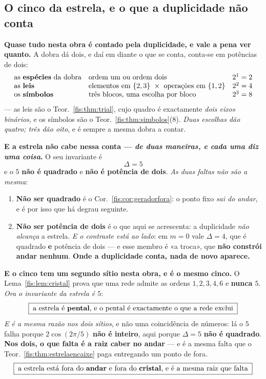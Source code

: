 \documentclass[livro.tex]{subfiles}
\begin{document}
\subsection*{O cinco da estrela, e o que a duplicidade não conta}

\noindent\textbf{Quase tudo nesta obra é contado pela duplicidade, e vale a pena
ver quanto.} A dobra dá dois, e daí em diante o que se conta, conta-se em potências
de dois:
\[
\begin{array}{lll}
\text{as \textbf{espécies} da dobra} & \text{ordem um ou ordem dois} & 2^{1}=2\\
\text{as \textbf{leis}} & \text{elementos em }\{2,3\}\ \times\ \text{operações em }\{1,2\} & 2^{2}=4\\
\text{os \textbf{símbolos}} & \text{três blocos, uma escolha por bloco} & 2^{3}=8
\end{array}
\]
--- as leis são o Teor.~\ref{fis:thm:trial}, cujo quadro é exactamente
\emph{dois eixos binários}, e os símbolos são o Teor.~\ref{fis:thm:simbolos}(8).
\emph{Duas escolhas dão quatro; três dão oito}, e é sempre a mesma dobra a contar.

\medskip\noindent\textbf{E a estrela não cabe nessa conta --- \emph{de duas
maneiras, e cada uma diz uma coisa}.} O seu invariante é
\[
\boxed{\;\Delta=5\;}
\]
e o $5$ \textbf{não é quadrado} e \textbf{não é potência de dois}. \emph{As duas
faltas não são a mesma}:
\begin{enumerate}\itemsep3pt
\item[(1)] \textbf{Não ser quadrado} é o Cor.~\ref{fis:cor:geradorfora}: o ponto
fixo \emph{sai do andar}, e é por isso que há degrau seguinte.
\item[(2)] \textbf{Não ser potência de dois} é o que aqui se acrescenta: a
duplicidade \emph{não alcança} a estrela. \emph{E o contraste está ao lado}: em
$m=0$ vale $\Delta=4$, que é quadrado \textbf{e} potência de dois --- e esse
membro é «a troca», que \textbf{não constrói andar nenhum}. \textbf{Onde a
duplicidade conta, nada de novo aparece.}
\end{enumerate}

\medskip\noindent\textbf{E o cinco tem um segundo sítio nesta obra, e é o mesmo
cinco.} O Lema~\ref{fis:lem:cristal} prova que uma rede admite as ordens
$1,2,3,4,6$ e \textbf{nunca $5$}. \emph{Ora o invariante da estrela é $5$}:
\[
\boxed{\;\text{a estrela é \textbf{pental}, e o pental é exactamente o que a rede exclui}\;}
\]
\emph{E é a mesma razão nos dois sítios}, e não uma coincidência de números: lá o
$5$ falha porque $2\cos(2\pi/5)$ \textbf{não é inteiro}, aqui porque $\Delta=5$
\textbf{não é quadrado}. \textbf{Nos dois, o que falta é a raiz caber no andar} ---
e é a mesma falta que o Teor.~\ref{fis:thm:estrelaencaixe} paga entregando um ponto
de fora.
\[
\boxed{\;\text{a estrela está fora do \textbf{andar} e fora do \textbf{cristal}, e é a mesma raiz que falta}\;}
\]
\end{document}
